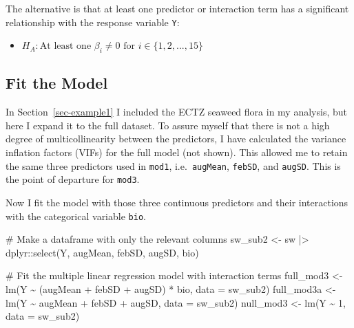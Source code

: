 \documentclass[
  letterpaper,
]{book}
\newenvironment{Shaded}{\begin{snugshade}}{\end{snugshade}}
\newcommand{\AttributeTok}[1]{\textcolor[rgb]{0.40,0.45,0.13}{#1}}
\newcommand{\CommentTok}[1]{\textcolor[rgb]{0.37,0.37,0.37}{#1}}
\newcommand{\DecValTok}[1]{\textcolor[rgb]{0.68,0.00,0.00}{#1}}
\newcommand{\FunctionTok}[1]{\textcolor[rgb]{0.28,0.35,0.67}{#1}}
\newcommand{\NormalTok}[1]{\textcolor[rgb]{0.00,0.23,0.31}{#1}}
\newcommand{\OtherTok}[1]{\textcolor[rgb]{0.00,0.23,0.31}{#1}}
\newcommand{\SpecialCharTok}[1]{\textcolor[rgb]{0.37,0.37,0.37}{#1}}
\providecommand{\tightlist}{%
  \setlength{\itemsep}{0pt}\setlength{\parskip}{0pt}}\usepackage{longtable,booktabs,array}
\begin{document}
The alternative is that at least one predictor or interaction term has a
significant relationship with the response variable \texttt{Y}:

\begin{itemize}
\tightlist
\item
  \(H_A: \text{At least one } \beta_i \neq 0 \text{ for } i \in \{1, 2, ..., 15\}\)
\end{itemize}

\subsection{Fit the Model}\label{fit-the-model-1}

In Section~\ref{sec-example1} I included the ECTZ seaweed flora in my
analysis, but here I expand it to the full dataset. To assure myself
that there is not a high degree of multicollinearity between the
predictors, I have calculated the variance inflation factors (VIFs) for
the full model (not shown). This allowed me to retain the same three
predictors used in \texttt{mod1}, i.e.~\texttt{augMean}, \texttt{febSD},
and \texttt{augSD}. This is the point of departure for \texttt{mod3}.

Now I fit the model with those three continuous predictors and their
interactions with the categorical variable \texttt{bio}.

\begin{Shaded}
\begin{Highlighting}[]
\CommentTok{\# Make a dataframe with only the relevant columns}
\NormalTok{sw\_sub2 }\OtherTok{\textless{}{-}}\NormalTok{ sw }\SpecialCharTok{|\textgreater{}}
\NormalTok{  dplyr}\SpecialCharTok{::}\FunctionTok{select}\NormalTok{(Y, augMean, febSD, augSD, bio)}

\CommentTok{\# Fit the multiple linear regression model with interaction terms}
\NormalTok{full\_mod3 }\OtherTok{\textless{}{-}} \FunctionTok{lm}\NormalTok{(Y }\SpecialCharTok{\textasciitilde{}}\NormalTok{ (augMean }\SpecialCharTok{+}\NormalTok{ febSD }\SpecialCharTok{+}\NormalTok{ augSD) }\SpecialCharTok{*}\NormalTok{ bio, }\AttributeTok{data =}\NormalTok{ sw\_sub2)}
\NormalTok{full\_mod3a }\OtherTok{\textless{}{-}} \FunctionTok{lm}\NormalTok{(Y }\SpecialCharTok{\textasciitilde{}}\NormalTok{ augMean }\SpecialCharTok{+}\NormalTok{ febSD }\SpecialCharTok{+}\NormalTok{ augSD, }\AttributeTok{data =}\NormalTok{ sw\_sub2)}
\NormalTok{null\_mod3 }\OtherTok{\textless{}{-}} \FunctionTok{lm}\NormalTok{(Y }\SpecialCharTok{\textasciitilde{}} \DecValTok{1}\NormalTok{, }\AttributeTok{data =}\NormalTok{ sw\_sub2)}
\end{Highlighting}
\end{Shaded}
\end{document}
